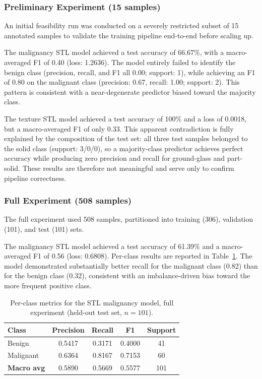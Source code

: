 \subsubsection{Preliminary Experiment (15 samples)}

An initial feasibility run was conducted on a severely restricted subset of 15 annotated samples to validate the training pipeline end-to-end before scaling up.

The malignancy STL model achieved a test accuracy of 66.67\%, with a macro-averaged F1 of 0.40 (loss: 1.2636). The model entirely failed to identify the benign class (precision, recall, and F1 all 0.00; support: 1), while achieving an F1 of 0.80 on the malignant class (precision: 0.67, recall: 1.00; support: 2). This pattern is consistent with a near-degenerate predictor biased toward the majority class.

The texture STL model achieved a test accuracy of 100\% and a loss of 0.0018, but a macro-averaged F1 of only 0.33. This apparent contradiction is fully explained by the composition of the test set: all three test samples belonged to the solid class (support: 3/0/0), so a majority-class predictor achieves perfect accuracy while producing zero precision and recall for ground-glass and part-solid. These results are therefore not meaningful and serve only to confirm pipeline correctness.

\subsubsection{Full Experiment (508 samples)}

The full experiment used 508 samples, partitioned into training (306), validation (101), and test (101) sets.

The malignancy STL model achieved a test accuracy of 61.39\% and a macro-averaged F1 of 0.56 (loss: 0.6808). Per-class results are reported in Table~\ref{tab:stl_malignancy_full}. The model demonstrated substantially better recall for the malignant class (0.82) than for the benign class (0.32), consistent with an imbalance-driven bias toward the more frequent positive class.

\begin{table}[h]
\centering
\caption{Per-class metrics for the STL malignancy model, full experiment
  (held-out test set, $n=101$).}
\label{tab:stl_malignancy_full}
\begin{tabular}{lcccc}
\hline
\textbf{Class} & \textbf{Precision} & \textbf{Recall} & \textbf{F1}
  & \textbf{Support} \\
\hline
Benign    & 0.5417 & 0.3171 & 0.4000 & 41 \\
Malignant & 0.6364 & 0.8167 & 0.7153 & 60 \\
\hline
\textbf{Macro avg} & 0.5890 & 0.5669 & 0.5577 & 101 \\
\hline
\end{tabular}
\end{table}

